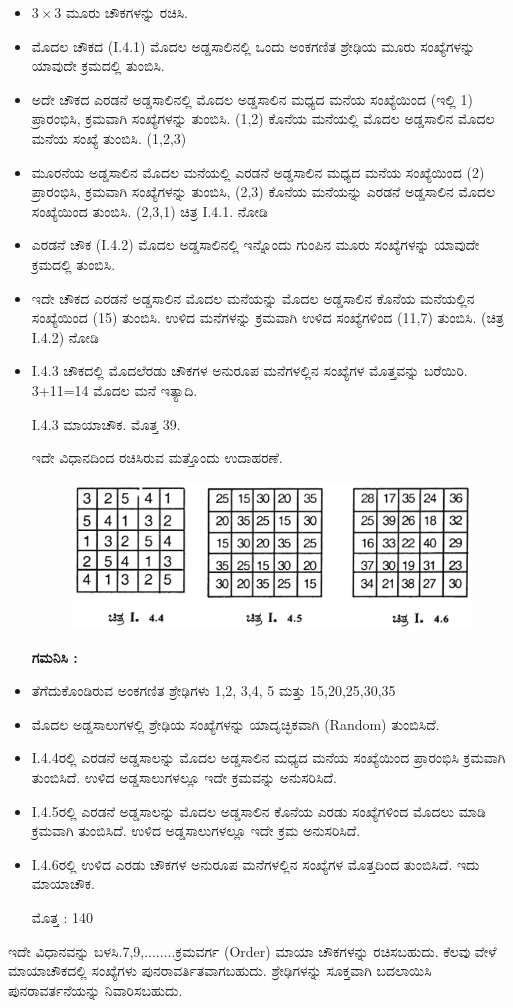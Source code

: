 \begin{itemize}
	\item $3 \times 3$ ಮೂರು ಚೌಕಗಳನ್ನು ರಚಿಸಿ.
	\item ಮೊದಲ ಚೌಕದ (I.4.1) ಮೊದಲ ಅಡ್ಡಸಾಲಿನಲ್ಲಿ ಒಂದು ಅಂಕಗಣಿತ ಶ್ರೇಢಿಯ ಮೂರು ಸಂಖ್ಯೆಗಳನ್ನು ಯಾವುದೇ ಕ್ರಮದಲ್ಲಿ ತುಂಬಿಸಿ.
	\item ಅದೇ ಚೌಕದ ಎರಡನೆ ಅಡ್ಡಸಾಲಿನಲ್ಲಿ ಮೊದಲ ಅಡ್ಡಸಾಲಿನ ಮಧ್ಯದ ಮನೆಯ ಸಂಖ್ಯೆಯಿಂದ (ಇಲ್ಲಿ 1) ಪ್ರಾರಂಭಿಸಿ, ಕ್ರಮವಾಗಿ ಸಂಖ್ಯೆಗಳನ್ನು ತುಂಬಿಸಿ. (1,2) ಕೊನೆಯ ಮನೆಯಲ್ಲಿ ಮೊದಲ ಅಡ್ಡಸಾಲಿನ ಮೊದಲ ಮನೆಯ ಸಂಖ್ಯೆ ತುಂಬಿಸಿ. (1,2,3)
	\item ಮೂರನೆಯ ಅಡ್ಡಸಾಲಿನ ಮೊದಲ ಮನೆಯಲ್ಲಿ ಎರಡನೆ ಅಡ್ಡಸಾಲಿನ ಮಧ್ಯದ ಮನೆಯ ಸಂಖ್ಯೆಯಿಂದ (2) ಪ್ರಾರಂಭಿಸಿ, ಕ್ರಮವಾಗಿ ಸಂಖ್ಯೆಗಳನ್ನು ತುಂಬಿಸಿ, (2,3) ಕೊನೆಯ ಮನೆಯನ್ನು ಎರಡನೆ ಅಡ್ಡಸಾಲಿನ ಮೊದಲ ಸಂಖ್ಯೆಯಿಂದ ತುಂಬಿಸಿ. (2,3,1) ಚಿತ್ರ I.4.1. ನೋಡಿ
	\item ಎರಡನೆ ಚೌಕ (I.4.2) ಮೊದಲ ಅಡ್ಡಸಾಲಿನಲ್ಲಿ ಇನ್ನೊಂದು ಗುಂಪಿನ ಮೂರು ಸಂಖ್ಯೆಗಳನ್ನು ಯಾವುದೇ ಕ್ರಮದಲ್ಲಿ ತುಂಬಿಸಿ.
	\item ಇದೇ ಚೌಕದ ಎರಡನೆ ಅಡ್ಡಸಾಲಿನ ಮೊದಲ ಮನೆಯನ್ನು ಮೊದಲ ಅಡ್ಡಸಾಲಿನ ಕೊನೆಯ ಮನೆಯಲ್ಲಿನ ಸಂಖ್ಯೆಯಿಂದ (15) ತುಂಬಿಸಿ. ಉಳಿದ ಮನೆಗಳನ್ನು ಕ್ರಮವಾಗಿ ಉಳಿದ ಸಂಖ್ಯೆಗಳಿಂದ (11,7) ತುಂಬಿಸಿ. (ಚಿತ್ರ I.4.2) ನೋಡಿ
	\item I.4.3 ಚೌಕದಲ್ಲಿ ಮೊದಲೆರಡು ಚೌಕಗಳ ಅನುರೂಪ ಮನೆಗಳಲ್ಲಿನ ಸಂಖ್ಯೆಗಳ ಮೊತ್ತವನ್ನು ಬರೆಯಿರಿ. 3+11=14 ಮೊದಲ ಮನೆ ಇತ್ಯಾದಿ.

	I.4.3 ಮಾಯಾಚೌಕ. ಮೊತ್ತ 39.

	ಇದೇ ವಿಧಾನದಿಂದ ರಚಿಸಿರುವ ಮತ್ತೊಂದು ಉದಾಹರಣೆ.
	\begin{figure}[h]
	\includegraphics{src/figures/chap3/fig3.10.jpg}
	\end{figure}

	\textbf{ಗಮನಿಸಿ :}
	\item ತೆಗೆದುಕೊಂಡಿರುವ ಅಂಕಗಣಿತ ಶ್ರೇಢಿಗಳು 1,2, 3,4, 5 ಮತ್ತು 15,20,25,30,35
	\item ಮೊದಲ ಅಡ್ಡಸಾಲುಗಳಲ್ಲಿ ಶ್ರೇಢಿಯ ಸಂಖ್ಯೆಗಳನ್ನು ಯಾದೃಚ್ಛಿಕವಾಗಿ (Random) ತುಂಬಿಸಿದೆ.
	\item I.4.4ರಲ್ಲಿ ಎರಡನೆ ಅಡ್ಡಸಾಲನ್ನು ಮೊದಲ ಅಡ್ಡಸಾಲಿನ ಮಧ್ಯದ ಮನೆಯ ಸಂಖ್ಯೆಯಿಂದ ಪ್ರಾರಂಭಿಸಿ ಕ್ರಮವಾಗಿ ತುಂಬಿಸಿದೆ. ಉಳಿದ ಅಡ್ಡಸಾಲುಗಳಲ್ಲೂ ಇದೇ ಕ್ರಮವನ್ನು ಅನುಸರಿಸಿದೆ.
	\item I.4.5ರಲ್ಲಿ ಎರಡನೆ ಅಡ್ಡಸಾಲನ್ನು ಮೊದಲ ಅಡ್ಡಸಾಲಿನ ಕೊನೆಯ ಎರಡು ಸಂಖ್ಯೆಗಳಿಂದ ಮೊದಲು ಮಾಡಿ ಕ್ರಮವಾಗಿ ತುಂಬಿಸಿದೆ. ಉಳಿದ ಅಡ್ಡಸಾಲುಗಳಲ್ಲೂ ಇದೇ ಕ್ರಮ ಅನುಸರಿಸಿದೆ.
	\item I.4.6ರಲ್ಲಿ ಉಳಿದ ಎರಡು ಚೌಕಗಳ ಅನುರೂಪ ಮನೆಗಳಲ್ಲಿನ ಸಂಖ್ಯೆಗಳ ಮೊತ್ತದಿಂದ ತುಂಬಿಸಿದೆ. ಇದು ಮಾಯಾಚೌಕ.

	ಮೊತ್ತ : 140
\end{itemize}
ಇದೇ ವಿಧಾನವನ್ನು ಬಳಸಿ.7,9,........ಕ್ರಮವರ್ಗ (Order) ಮಾಯಾ ಚೌಕಗಳನ್ನು ರಚಿಸಬಹುದು. ಕೆಲವು ವೇಳೆ ಮಾಯಾಚೌಕದಲ್ಲಿ ಸಂಖ್ಯೆಗಳು ಪುನರಾವರ್ತಿತವಾಗಬಹುದು. ಶ್ರೇಢಿಗಳನ್ನು ಸೂಕ್ತವಾಗಿ ಬದಲಾಯಿಸಿ ಪುನರಾವರ್ತನೆಯನ್ನು ನಿವಾರಿಸಬಹುದು.

